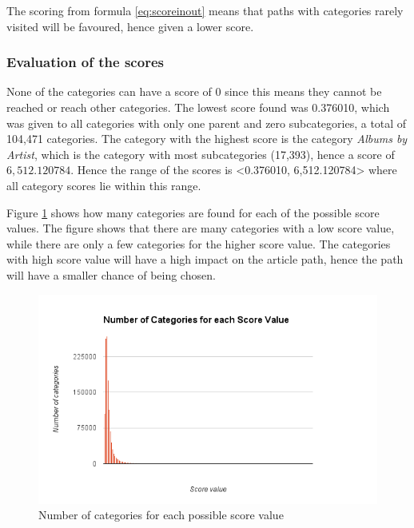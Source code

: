 The scoring from formula \ref{eq:scoreinout} means that paths with categories rarely visited will be favoured, hence given a lower score. 

\subsubsection{Evaluation of the scores}
None of the categories can have a score of 0 since this means they cannot be reached or reach other categories. The lowest score found was 0.376010, which was given to all categories with only one parent and zero subcategories, a total of 104,471 categories.  The category with the highest score is the category \emph{Albums by Artist}, which is the category with most subcategories (17,393), hence a score of $6,512.120784$. Hence the range of the scores is <0.376010, 6,512.120784> where all category scores lie within this range. 

Figure \ref{fig:scorevalue} shows how many categories are found for each of the possible score values. The figure shows that there are many categories with a low score value, while there are only a few categories for the higher score value. The categories with high score value will have a high impact on the article path, hence the path will have a smaller chance of being chosen.

\begin{figure}[h]
\centering
\includegraphics[width=\textwidth]{Chapters/Implementation/Grading/Inlinkoutlink_scorevalue_numberofcategories}
\caption{Number of categories for each possible score value}
\label{fig:scorevalue}
\end{figure}




